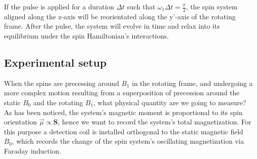 \documentclass[11.5pt,a4paper]{article}
\begin{document}
If the pulse is applied for a duration $\Delta t$ such that $\omega_1 \Delta t = \tfrac{\pi}{2}$, the spin system aligned along the z-axis will be reorientated along the y'-axis of the rotating frame. After the pulse, the system will evolve in time and relax into its equilibrium under the spin Hamiltonian's interactions. 

\subsection{Experimental setup}
When the spins are precessing around $B_1$ in the rotating frame, and undergoing a more complex motion resulting from a superposition of precession around the static $B_0$ and the rotating $B_1$, what physical quantity are we going to measure? As has been noticed, the system's magnetic moment is proportional to its spin orientation $\vec{\mu} \propto \mathbf{S}$, hence we want to record the system's total magnetization. For this purpose a detection coil is installed orthogonal to the static magnetic field $B_0$, which records the change of the spin system's oscillating magnetization via Faraday induction.
\end{document}
